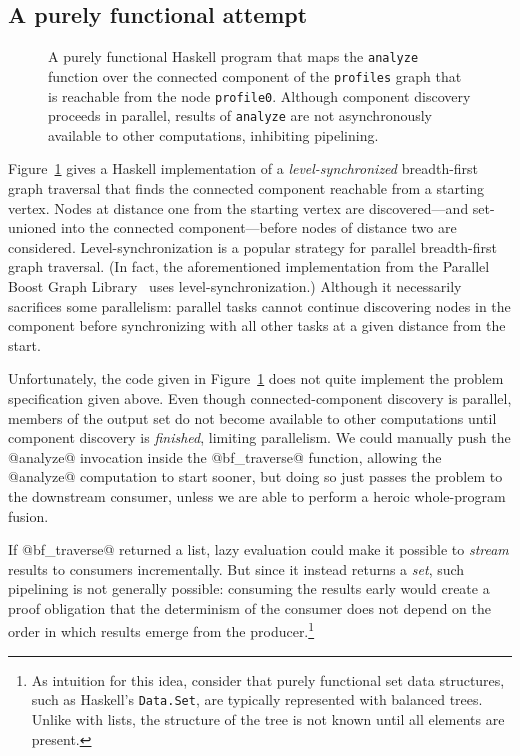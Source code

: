 \subsection{A purely functional attempt}

\begin{figure}
  
  \caption{A purely functional Haskell program that maps the
    \lstinline|analyze| function over the connected component of the
    \lstinline|profiles| graph that is reachable from the node
    \lstinline|profile0|.  Although component discovery proceeds in
    parallel, results of \lstinline|analyze| are not asynchronously
    available to other computations, inhibiting pipelining.}
  \label{f:bfs-pure}
\end{figure}

Figure~\ref{f:bfs-pure} gives a Haskell implementation of a
\emph{level-synchronized} breadth-first graph traversal that finds the
connected component reachable from a starting vertex.  Nodes at
distance one from the starting vertex are discovered---and set-unioned
into the connected component---before nodes of distance two are
considered.  Level-synchronization is a popular strategy for parallel
breadth-first graph traversal.  (In fact, the aforementioned
implementation from the Parallel Boost Graph Library~\cite{bfs-pbgl}
uses level-synchronization.)  Although it necessarily sacrifices some
parallelism: parallel tasks cannot continue
discovering nodes in the component before synchronizing with all other
tasks at a given distance from the start.

Unfortunately, the code given in Figure~\ref{f:bfs-pure} does not
quite implement the problem specification given above.  Even though
connected-component discovery is parallel, members of the output set
do not become available to other computations until component
discovery is \emph{finished}, limiting parallelism.  We could
manually push the @analyze@ invocation inside the @bf_traverse@
function, allowing the @analyze@ computation to start sooner, but
doing so just passes the problem to the downstream consumer, unless
we are able to perform a heroic whole-program fusion.

If @bf_traverse@ returned a list, lazy evaluation could make it
possible to \emph{stream} results to consumers incrementally.  But
since it instead returns a \emph{set}, such pipelining is not
generally possible: consuming the results early would create a proof
obligation that the determinism of the consumer does not depend on the
order in which results emerge from the producer.\footnote{As intuition
  for this idea, consider that purely functional set data structures,
  such as Haskell's \lstinline|Data.Set|, are typically represented
  with balanced trees.  Unlike with lists, the structure of the tree
  is not known until all elements are present.}

